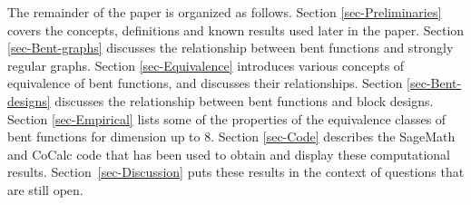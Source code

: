 \documentclass[12pt,a4paper]{article}
\newcommand{\mb}[1]{\mathbb{#1}}
\newcommand{\F}{\mb{F}}
\newtheorem{Theorem}{Theorem}
\begin{document}
%
%
The remainder of the paper is organized as follows.
Section \ref{sec-Preliminaries} covers the concepts, definitions and known results used later in the paper.
Section \ref{sec-Bent-graphs} discusses the relationship between bent functions and strongly regular graphs.
Section \ref{sec-Equivalence} introduces various concepts of equivalence of bent functions,
and discusses their relationships.
Section \ref{sec-Bent-designs} discusses the relationship between bent functions and block designs.
Section \ref{sec-Empirical} lists some of the properties of the equivalence classes of bent functions for dimension up to 8.
Section \ref{sec-Code} describes the SageMath and CoCalc code that has been used to obtain
and display these computational results.
Section~\ref{sec-Discussion} puts these results in the context of questions that are still open.
%
%
%
%
%
%
%
%
%
%
%
\end{document}
